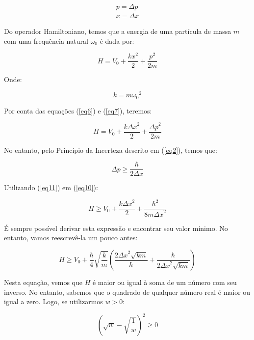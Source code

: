 \documentclass[11pt, a4paper]{article}
\begin{document}
\begin{eqnarray}
    p = \Delta p  \label{eq6} \\
    x = \Delta x  \label{eq7}
\end{eqnarray}

Do operador Hamiltoniano, temos que a energia de uma partícula de massa $m$ com uma frequência natural ${\omega}_0$ é dada por:

\begin{equation}
    H = V_0 + \frac{k x^2}{2} + \frac{p^2}{2m}
    \label{eq8}
\end{equation}

Onde:

\begin{equation}
    k = m {{\omega}_0}^2
    \label{eq9}
\end{equation}

Por conta das equações (\ref{eq6}) e (\ref{eq7}), teremos:

\begin{equation}
    H = V_0 + \frac{k {\Delta x}^2}{2} + \frac{{\Delta p}^2}{2m}
    \label{eq10}
\end{equation}

No entanto, pelo Princípio da Incerteza descrito em (\ref{eq2}), temos que:

\begin{equation}
    \Delta p \geq \frac{\hbar}{2 \Delta x}
    \label{eq11}
\end{equation}

Utilizando (\ref{eq11}) em (\ref{eq10}):

\begin{equation}
    H \geq V_0 + \frac{k {\Delta x}^2}{2} + \frac{{\hbar}^2}{8m{\Delta x}^2}
    \label{eq12}
\end{equation}

É sempre possível derivar esta expressão e encontrar seu valor mínimo. No entanto, vamos reescrevê-la um pouco antes:

\begin{equation}
    H \geq V_0 + \frac{\hbar}{4}\sqrt{\frac{k}{m}} \left( \frac{2{\Delta x}^2 \sqrt{km}}{\hbar} + \frac{\hbar}{2{\Delta x}^2 \sqrt{km}} \right)
    \label{eq13}
\end{equation}

Nesta equação, vemos que $H$ é maior ou igual à soma de um número com seu inverso. No entanto, sabemos que o quadrado de qualquer número real é maior ou igual a zero. Logo, se utilizarmos $w > 0$:

\begin{equation}
    \left(\sqrt{w} - \sqrt{\frac{1}{w}} \right)^2 \geq 0   \label{eq14}
\end{equation}
\end{document}
